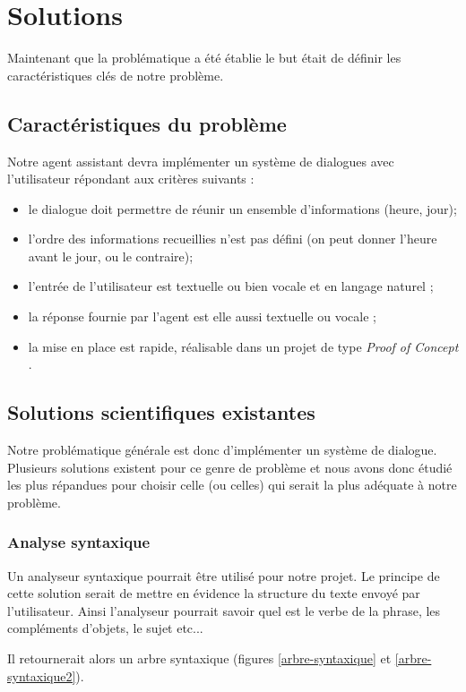\chapter{Solutions}

Maintenant que la problématique a été établie le but était de définir les caractéristiques clés de notre problème.


\section{Caractéristiques du problème}
Notre agent assistant devra implémenter un système de dialogues avec l'utilisateur répondant aux critères suivants :
\begin{itemize}
	\item le dialogue doit permettre de réunir un ensemble d'informations (heure, jour);
 	\item l'ordre des informations recueillies n'est pas défini (on peut donner l'heure avant le jour, ou le contraire);
 	\item l'entrée de l'utilisateur est textuelle ou bien vocale et en langage naturel ;
 	\item la réponse fournie par l'agent est elle aussi textuelle ou vocale ;
 	\item la mise en place est rapide, réalisable dans un projet de type \og \textit{Proof of Concept} \fg.
\end{itemize}

\section{Solutions scientifiques existantes}
Notre problématique générale est donc d'implémenter un système de dialogue. Plusieurs solutions existent pour ce genre de problème et nous avons donc étudié les plus répandues pour choisir celle (ou celles) qui serait la plus adéquate à notre problème.

\subsection{Analyse syntaxique}
Un analyseur syntaxique pourrait être utilisé pour notre projet. Le principe de cette solution serait de mettre en évidence la structure du texte envoyé par l'utilisateur. Ainsi l'analyseur pourrait savoir quel est le verbe de la phrase, les compléments d'objets, le sujet etc... 

Il retournerait alors un arbre syntaxique (figures \ref{arbre-syntaxique} et \ref{arbre-syntaxique2}). 

